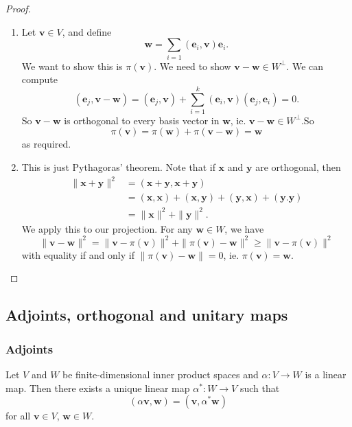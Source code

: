 \documentclass[a4paper]{article}
\begin{document}
\begin{proof}\leavevmode
  \begin{enumerate}
    \item Let $\mathbf{v} \in V$, and define
      \[
        \mathbf{w} = \sum_{i = 1} (\mathbf{e}_i, \mathbf{v}) \mathbf{e}_i.
      \]
      We want to show this is $\pi(\mathbf{v})$. We need to show $\mathbf{v} - \mathbf{w} \in W^\perp$. We can compute
      \[
        (\mathbf{e}_j, \mathbf{v} - \mathbf{w}) = (\mathbf{e}_j, \mathbf{v}) + \sum_{i = 1}^k (\mathbf{e}_i, \mathbf{v}) (\mathbf{e}_j, \mathbf{e}_i) = 0.
      \]
      So $\mathbf{v} - \mathbf{w}$ is orthogonal to every basis vector in $\mathbf{w}$, ie. $\mathbf{v} - \mathbf{w} \in W^\perp$.So
      \[
        \pi(\mathbf{v}) = \pi(\mathbf{w}) + \pi(\mathbf{v} - \mathbf{w}) = \mathbf{w}
      \]
      as required.
    \item This is just Pythagoras' theorem. Note that if $\mathbf{x}$ and $\mathbf{y}$ are orthogonal, then
      \begin{align*}
        \|\mathbf{x} + \mathbf{y}\|^2 &= (\mathbf{x} + \mathbf{y}, \mathbf{x} + \mathbf{y}) \\
        &= (\mathbf{x}, \mathbf{x}) + (\mathbf{x}, \mathbf{y}) + (\mathbf{y}, \mathbf{x}) + (\mathbf{y}. \mathbf{y})\\
        &= \|\mathbf{x}\|^2 + \|\mathbf{y}\|^2.
      \end{align*}
      We apply this to our projection. For any $\mathbf{w} \in W$, we have
      \[
        \|\mathbf{v} - \mathbf{w}\|^2 = \|\mathbf{v} - \pi (\mathbf{v})\|^2 + \|\pi(\mathbf{v}) - \mathbf{w}\|^2 \geq \|\mathbf{v} - \pi(\mathbf{v})\|^2
      \]
      with equality if and only if $\|\pi(\mathbf{v}) - \mathbf{w}\| = 0$, ie. $\pi(\mathbf{v}) = \mathbf{w}$.
  \end{enumerate}
\end{proof}

\subsection{Adjoints, orthogonal and unitary maps}
\subsubsection*{Adjoints}
\begin{lemma}
  Let $V$ and $W$ be finite-dimensional inner product spaces and $\alpha: V \to W$ is a linear map. Then there exists a unique linear map $\alpha^*: W \to V$ such that
  \[
    (\alpha \mathbf{v}, \mathbf{w}) = (\mathbf{v}, \alpha^* \mathbf{w})\tag{$*$}
  \]
  for all $\mathbf{v} \in V$, $\mathbf{w} \in W$.
\end{lemma}
\end{document}
